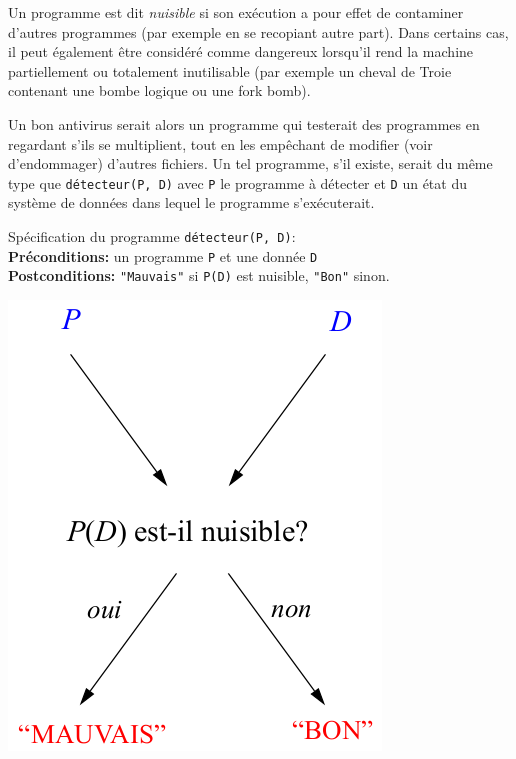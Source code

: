 \begin{mydef}
	Un programme est dit \emph{nuisible} si son exécution a pour effet de contaminer d'autres programmes (par exemple en se recopiant autre part). Dans certains cas, il peut également être considéré comme dangereux lorsqu'il rend la machine partiellement ou totalement inutilisable (par exemple un cheval de Troie contenant une bombe logique ou une fork bomb).
\end{mydef}

Un bon antivirus serait alors un programme qui testerait des programmes en regardant s'ils se multiplient, tout en les empêchant de modifier (voir d'endommager) d'autres fichiers. Un tel programme, s'il existe, serait du même type que \lstinline|détecteur(P, D)| avec \lstinline|P| le programme à détecter et \lstinline|D| un état du système de données dans lequel le programme s'exécuterait.

\noindent Spécification du programme \lstinline|détecteur(P, D)|:\\
\textbf{Préconditions:} un programme \lstinline|P| et une donnée \lstinline|D|\\
\textbf{Postconditions:} \lstinline|"Mauvais"| si \lstinline|P(D)| est nuisible, \lstinline|"Bon"| sinon.

\begin{center}
\includegraphics[scale=0.45]{Images/effet_detecteur.png}
\end{center}


